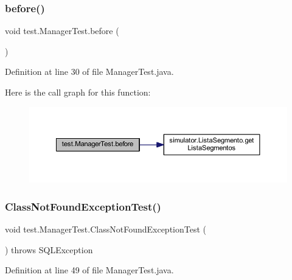 \subsubsection{\texorpdfstring{before()}{before()}}
{\footnotesize\ttfamily void test.\+Manager\+Test.\+before (\begin{DoxyParamCaption}{ }\end{DoxyParamCaption})}



Definition at line 30 of file Manager\+Test.\+java.

Here is the call graph for this function\+:\nopagebreak
\begin{figure}[H]
\begin{center}
\leavevmode
\includegraphics[width=350pt]{classtest_1_1_manager_test_ad710f9a15cc2d2f6aaeb827b25cbd1d2_cgraph}
\end{center}
\end{figure}
\mbox{\label{classtest_1_1_manager_test_a85a4be4f4bd5606a127e983fa4e3883d}} 
\subsubsection{\texorpdfstring{Class\+Not\+Found\+Exception\+Test()}{ClassNotFoundExceptionTest()}}
{\footnotesize\ttfamily void test.\+Manager\+Test.\+Class\+Not\+Found\+Exception\+Test (\begin{DoxyParamCaption}{ }\end{DoxyParamCaption}) throws S\+Q\+L\+Exception}



Definition at line 49 of file Manager\+Test.\+java.

\mbox{\label{classtest_1_1_manager_test_a7b2f9075ed25eb6389bb263099a75c1c}} 
